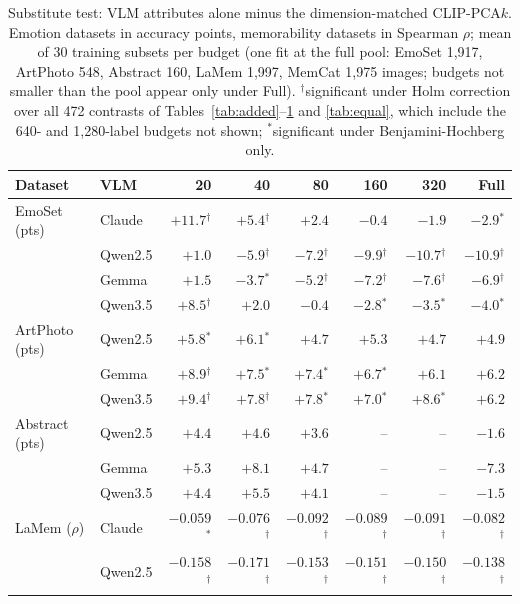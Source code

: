 \begin{table}[t]
\centering
\caption{Substitute test: VLM attributes alone minus the dimension-matched CLIP-PCA$k$. Emotion datasets in accuracy points, memorability datasets in Spearman $\rho$; mean of 30 training subsets per budget (one fit at the full pool: EmoSet 1,917, ArtPhoto 548, Abstract 160, LaMem 1,997, MemCat 1,975 images; budgets not smaller than the pool appear only under Full). $^{\dagger}$significant under Holm correction over all 472 contrasts of Tables~\ref{tab:added}--\ref{tab:subst} and \ref{tab:equal}, which include the 640- and 1,280-label budgets not shown; $^{*}$significant under Benjamini-Hochberg only.}
\label{tab:subst}
\footnotesize
\setlength{\tabcolsep}{4pt}
\begin{tabular}{@{}llrrrrrr@{}}
\toprule
Dataset & VLM & 20 & 40 & 80 & 160 & 320 & Full \\
\midrule
EmoSet (pts) & Claude & $+11.7$$^{\dagger}$ & $+5.4$$^{\dagger}$ & $+2.4$ & $-0.4$ & $-1.9$ & $-2.9$$^{*}$ \\
 & Qwen2.5 & $+1.0$ & $-5.9$$^{\dagger}$ & $-7.2$$^{\dagger}$ & $-9.9$$^{\dagger}$ & $-10.7$$^{\dagger}$ & $-10.9$$^{\dagger}$ \\
 & Gemma & $+1.5$ & $-3.7$$^{*}$ & $-5.2$$^{\dagger}$ & $-7.2$$^{\dagger}$ & $-7.6$$^{\dagger}$ & $-6.9$$^{\dagger}$ \\
 & Qwen3.5 & $+8.5$$^{\dagger}$ & $+2.0$ & $-0.4$ & $-2.8$$^{*}$ & $-3.5$$^{*}$ & $-4.0$$^{*}$ \\
\addlinespace
ArtPhoto (pts) & Qwen2.5 & $+5.8$$^{*}$ & $+6.1$$^{*}$ & $+4.7$ & $+5.3$ & $+4.7$ & $+4.9$ \\
 & Gemma & $+8.9$$^{\dagger}$ & $+7.5$$^{*}$ & $+7.4$$^{*}$ & $+6.7$$^{*}$ & $+6.1$ & $+6.2$ \\
 & Qwen3.5 & $+9.4$$^{\dagger}$ & $+7.8$$^{\dagger}$ & $+7.8$$^{*}$ & $+7.0$$^{*}$ & $+8.6$$^{*}$ & $+6.2$ \\
\addlinespace
Abstract (pts) & Qwen2.5 & $+4.4$ & $+4.6$ & $+3.6$ & -- & -- & $-1.6$ \\
 & Gemma & $+5.3$ & $+8.1$ & $+4.7$ & -- & -- & $-7.3$ \\
 & Qwen3.5 & $+4.4$ & $+5.5$ & $+4.1$ & -- & -- & $-1.5$ \\
\addlinespace
LaMem ($\rho$) & Claude & $-0.059$$^{*}$ & $-0.076$$^{\dagger}$ & $-0.092$$^{\dagger}$ & $-0.089$$^{\dagger}$ & $-0.091$$^{\dagger}$ & $-0.082$$^{\dagger}$ \\
 & Qwen2.5 & $-0.158$$^{\dagger}$ & $-0.171$$^{\dagger}$ & $-0.153$$^{\dagger}$ & $-0.151$$^{\dagger}$ & $-0.150$$^{\dagger}$ & $-0.138$$^{\dagger}$ \\

\end{tabular}
\end{table}
